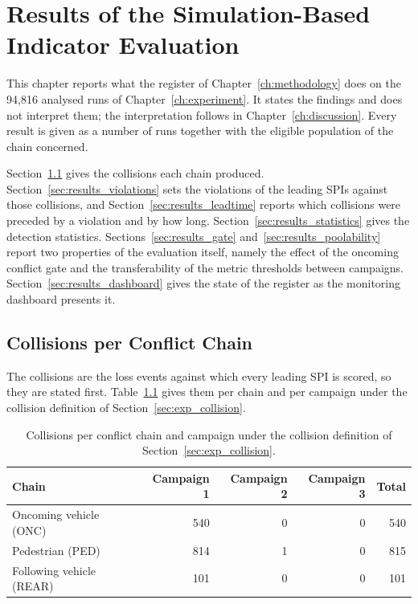 \chapter[Results]{Results of the Simulation-Based Indicator Evaluation}
\label{ch:results}

This chapter reports what the register of Chapter~\ref{ch:methodology} does on
the 94,816 analysed runs of Chapter~\ref{ch:experiment}. It states the findings
and does not interpret them; the interpretation follows in
Chapter~\ref{ch:discussion}. Every result is given as a number of runs together
with the eligible population of the chain concerned.

Section~\ref{sec:results_collisions} gives the collisions each chain produced.
Section~\ref{sec:results_violations} sets the violations of the leading SPIs
against those collisions, and Section~\ref{sec:results_leadtime} reports which
collisions were preceded by a violation and by how long.
Section~\ref{sec:results_statistics} gives the detection statistics.
Sections~\ref{sec:results_gate} and~\ref{sec:results_poolability} report two
properties of the evaluation itself, namely the effect of the oncoming conflict
gate and the transferability of the metric thresholds between campaigns.
Section~\ref{sec:results_dashboard} gives the state of the register as the
monitoring dashboard presents it.

\section{Collisions per Conflict Chain}
\label{sec:results_collisions}

The collisions are the loss events against which every leading SPI is scored, so
they are stated first. Table~\ref{tab:collisions_per_chain} gives them per chain and per
campaign under the collision definition of
Section~\ref{sec:exp_collision}.

\begin{table}[htbp]
    \centering
    \caption[Collisions per conflict chain]{Collisions per conflict chain and campaign under the collision definition of Section~\ref{sec:exp_collision}.}
    \label{tab:collisions_per_chain}
    \small
    \begin{tabular}{@{}lrrrr@{}}
        \toprule
        {\bfseries Chain} & {\bfseries Campaign 1} & {\bfseries Campaign 2} &
        {\bfseries Campaign 3} & {\bfseries Total} \\
        \midrule
        Oncoming vehicle (ONC)  & 540 & 0 & 0 & 540 \\
        Pedestrian (PED)        & 814 & 1 & 0 & 815 \\
        Following vehicle (REAR)& 101 & 0 & 0 & 101 \\
        \bottomrule
    \end{tabular}
\end{table}

